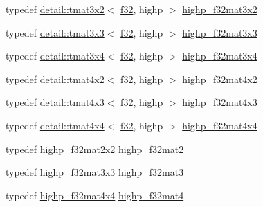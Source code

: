 \begin{DoxyCompactItemize}
\item 
typedef \hyperlink{structglm_1_1detail_1_1tmat3x2}{detail\+::tmat3x2}$<$ \hyperlink{group__gtc__type__precision_ga0ec999b57f5330d9021256e96038df04}{f32}, highp $>$ \hyperlink{group__gtc__type__precision_gaf36b2b34ea881977c61491b0d3b25a28}{highp\+\_\+f32mat3x2}
\item 
typedef \hyperlink{structglm_1_1detail_1_1tmat3x3}{detail\+::tmat3x3}$<$ \hyperlink{group__gtc__type__precision_ga0ec999b57f5330d9021256e96038df04}{f32}, highp $>$ \hyperlink{group__gtc__type__precision_ga334eca23d23aef90972fb20c5b749ca3}{highp\+\_\+f32mat3x3}
\item 
typedef \hyperlink{structglm_1_1detail_1_1tmat3x4}{detail\+::tmat3x4}$<$ \hyperlink{group__gtc__type__precision_ga0ec999b57f5330d9021256e96038df04}{f32}, highp $>$ \hyperlink{group__gtc__type__precision_gaa71f504ecb02f9178026b01013b77ba0}{highp\+\_\+f32mat3x4}
\item 
typedef \hyperlink{structglm_1_1detail_1_1tmat4x2}{detail\+::tmat4x2}$<$ \hyperlink{group__gtc__type__precision_ga0ec999b57f5330d9021256e96038df04}{f32}, highp $>$ \hyperlink{group__gtc__type__precision_ga4d799497b303c2434fe709f81f6bd4dd}{highp\+\_\+f32mat4x2}
\item 
typedef \hyperlink{structglm_1_1detail_1_1tmat4x3}{detail\+::tmat4x3}$<$ \hyperlink{group__gtc__type__precision_ga0ec999b57f5330d9021256e96038df04}{f32}, highp $>$ \hyperlink{group__gtc__type__precision_ga5bd692575886422f501a379386e391d9}{highp\+\_\+f32mat4x3}
\item 
typedef \hyperlink{structglm_1_1detail_1_1tmat4x4}{detail\+::tmat4x4}$<$ \hyperlink{group__gtc__type__precision_ga0ec999b57f5330d9021256e96038df04}{f32}, highp $>$ \hyperlink{group__gtc__type__precision_gafe24f12e4f5453058caea3f583ad7d9c}{highp\+\_\+f32mat4x4}
\item 
typedef \hyperlink{group__gtc__type__precision_gaf3a2cc948ca6fd168391138ce6fdd100}{highp\+\_\+f32mat2x2} \hyperlink{group__gtc__type__precision_gaed934f561aaf8ad891c0a8f5e719aea8}{highp\+\_\+f32mat2}
\item 
typedef \hyperlink{group__gtc__type__precision_ga334eca23d23aef90972fb20c5b749ca3}{highp\+\_\+f32mat3x3} \hyperlink{group__gtc__type__precision_ga06809818db73785334f839742a9ad85a}{highp\+\_\+f32mat3}
\item 
typedef \hyperlink{group__gtc__type__precision_gafe24f12e4f5453058caea3f583ad7d9c}{highp\+\_\+f32mat4x4} \hyperlink{group__gtc__type__precision_gac14c1bfb647e39d459c7489ede2156cc}{highp\+\_\+f32mat4}
\item 

\end{DoxyCompactItemize}

